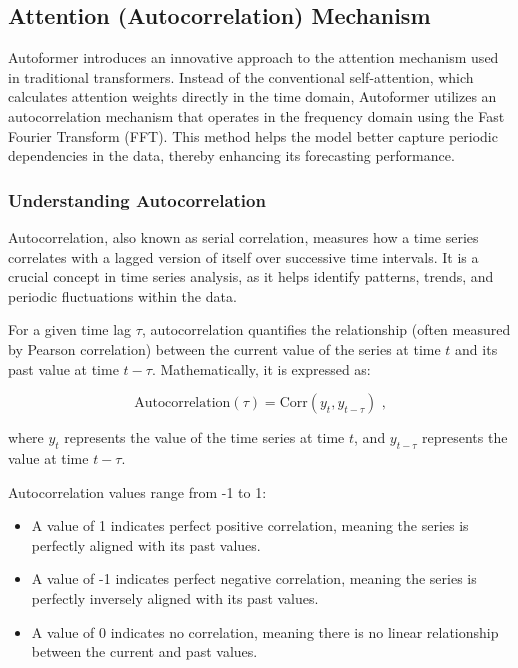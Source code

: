 \subsection{Attention (Autocorrelation) Mechanism}
Autoformer introduces an innovative approach to the attention mechanism used in traditional transformers. Instead of the conventional self-attention, which calculates attention weights directly in the time domain, Autoformer utilizes an autocorrelation mechanism that operates in the frequency domain using the Fast Fourier Transform (FFT). This method helps the model better capture periodic dependencies in the data, thereby enhancing its forecasting performance.

\subsubsection{Understanding Autocorrelation}
Autocorrelation, also known as serial correlation, measures how a time series correlates with a lagged version of itself over successive time intervals. It is a crucial concept in time series analysis, as it helps identify patterns, trends, and periodic fluctuations within the data.

For a given time lag \( \tau \), autocorrelation quantifies the relationship (often measured by Pearson correlation) between the current value of the series at time \( t \) and its past value at time \( t - \tau \). Mathematically, it is expressed as:

\begin{equation}
\text{Autocorrelation}(\tau) = \text{Corr}(y_t, y_{t-\tau}) \text{ ,}
\end{equation}

where \( y_t \) represents the value of the time series at time \( t \), and \( y_{t-\tau} \) represents the value at time \( t - \tau \).

Autocorrelation values range from -1 to 1:
\begin{itemize}
    \item A value of 1 indicates perfect positive correlation, meaning the series is perfectly aligned with its past values.
    \item A value of -1 indicates perfect negative correlation, meaning the series is perfectly inversely aligned with its past values.
    \item A value of 0 indicates no correlation, meaning there is no linear relationship between the current and past values.
\end{itemize}

